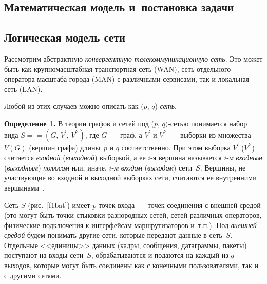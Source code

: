 \begin{multicols}{2}
{}

\section{Математическая модель и~постановка задачи}

\subsection{Логическая модель сети}

Рассмотрим абстрактную \textit{конвергентную телекоммуникационную
сеть}. Это может быть как крупномасштабная транспортная сеть (WAN), сеть
отдельного оператора масштаба города (MAN) с различными сервисами, так и
локальная сеть (LAN).

Любой из этих случаев можно описать как ($p,\,q$)-\textit{сеть}.

\medskip
\textbf{Определение 1.} В теории графов и сетей под ($p,\,q)$-сетью понимается
набор вида $S =$\linebreak $=(G,\,V^\prime ,\,V^{\prime\prime})$, где $G$~---
граф, а $V^\prime$ и $V^{\prime\prime}$~--- выборки из множества $V(G)$ (вершин
графа) длины~$p$ и $q$ соответственно. При этом выборка $V^\prime$
($V^{\prime\prime}$) считается \textit{входной} (\textit{выходной}) выборкой, а
ее $i$-я вершина называется $i$-\textit{м} \textit{входным} (\textit{выходным})
\textit{полюсом} или, иначе, $i$-\textit{м} \textit{входом} (\textit{выходом})
сети~$S$. Вершины, не участвующие во входной и выходной выборках сети,
считаются ее внутренними вершинами~\cite{1bat}.

Сеть $S$ (рис.~\ref{f1bat}) имеет $p$ точек входа~--- точек соединения
с внешней средой (это могут быть точки стыковки разнородных сетей, сетей
различных операторов, физические подключения к интерфейсам
маршрутизаторов и~т.п.). Под \textit{внешней средой} будем понимать другие
сети, которые передают данные в сеть~$S$. Отдельные <<единицы>> данных
(кадры, сообщения, датаграммы, пакеты) поступают на входы сети~$S$,
обрабатываются и подаются на каждый из $q$ выходов, которые могут быть
соединены как с конечными пользователями, так и с другими сетями.
\begin{figure*} %
\vspace*{1pt}
\begin{center}
\mbox{%
\epsfxsize=139.7mm 
}
\end{center}
\vspace*{-9pt} 
\end{figure*}


\end{multicols}
